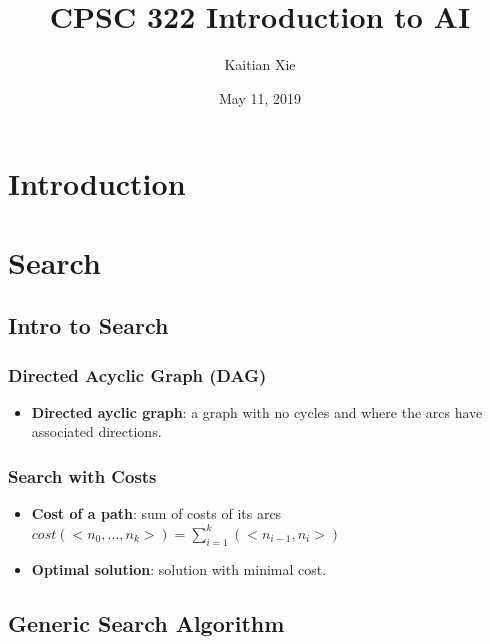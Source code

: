 \documentclass{article}
\title{CPSC 322 Introduction to AI}
\author{Kaitian Xie}
\date{May 11, 2019}
\begin{document}
\maketitle
\pagebreak

\section{Introduction}

\section{Search}

\subsection{Intro to Search}

\subsubsection{Directed Acyclic Graph (DAG)}

\begin{itemize}
    \item \textbf{Directed ayclic graph}: a graph with no cycles and where the arcs have associated directions.
\end{itemize}

\subsubsection{Search with Costs}

\begin{itemize}
    \item \textbf{Cost of a path}: sum of costs of its arcs $cost(<n_0, \ldots, n_k>) = \sum\limits_{i=1}^{k} (<n_{i-1}, n_i>)$
    \item \textbf{Optimal solution}: solution with minimal cost.
\end{itemize}

\subsection{Generic Search Algorithm}

\begin{algorithmic}
        \EndIf
        \EndFor
    \EndWhile
\end{algorithmic}
\end{document}

